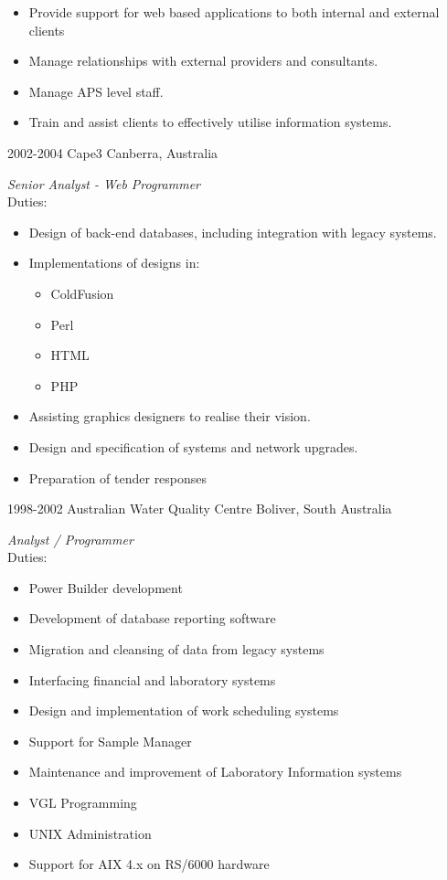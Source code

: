 \documentclass[]{friggeri-cv} %
\begin{document}
\begin{entrylist}
{\begin{itemize}
\item Provide support for web based applications to both internal and external clients
\item Manage relationships with external providers and consultants.
\item Manage APS level staff.
\item Train and assist clients to effectively utilise information systems.
\end{itemize}}
\entry
{2002-2004}
{Cape3}
{Canberra, Australia}
{\emph{Senior Analyst - Web Programmer} \\
Duties:
\begin{itemize}
\item Design of back-end databases, including integration with legacy systems.
\item Implementations of designs in:
\begin{itemize}
\item ColdFusion
\item Perl
\item HTML
\item PHP
\end{itemize}
\item Assisting graphics designers to realise their vision.
\item Design and specification of systems and network upgrades.
\item Preparation of tender responses
\end{itemize}}
\entry
{1998-2002}
{Australian Water Quality Centre}
{Boliver, South Australia}
{\emph{Analyst / Programmer} \\
Duties:
\begin{itemize}
\item Power Builder development
\item Development of database reporting software
\item Migration and cleansing of data from legacy systems
\item Interfacing financial and laboratory systems
\item Design and implementation of work scheduling systems
\item Support for Sample Manager
\item Maintenance and improvement of Laboratory Information systems
\item VGL Programming
\item UNIX Administration
\item Support for AIX 4.x on RS/6000 hardware

\end{itemize}}
\end{entrylist}
\end{document}
